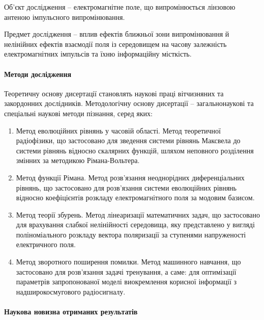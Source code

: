 Об’єкт дослідження -- електромагнітне поле, що випромінюється 
лінзовою антеною імпульсного випромінювання.

Предмет дослідження -- вплив ефектів ближньої зони випромінювання 
й нелінійних ефектів взаємодії поля із середовищем на часову залежність
електромагнітних імпульсів та їхню інформаційну місткість.

\paragraph{Методи дослідження}

Теоретичну основу дисертації становлять наукові праці вітчизняних та 
закордонних дослідників. Методологічну основу дисертації -- 
загальнонаукові та спеціальні наукові методи пізнання, серед яких:

\begin{enumerate}

\item Метод еволюційних рівнянь у часовій області. Метод теоретичної 
радіофізики, що застосовано для зведення системи рівнянь Максвела до 
системи рівнянь відносно скалярних функцій, шляхом неповного розділення 
змінних за методикою Рімана-Вольтера.

\item Метод функції Рімана. Метод розв'язання неоднорідних 
диференціальних рівнянь, що застосовано для розв'язання системи еволюційних рівнянь відносно коефіцієнтів розкладу електромагнітного 
поля за модовим базисом.

\item Метод теорії збурень. Метод лінеаризації математичних задач, що 
застосовано для врахування слабкої нелінійності середовища, яку представлено 
у вигляді поліноміального розкладу вектора поляризації за ступенями 
напруженості електричного поля.

\item Метод зворотного поширення помилки. Метод машинного навчання,
що застосовано для розв'язання задачі тренування, а саме: для 
оптимізації параметрів запропонованої моделі виокремлення корисної 
інформації з надширокосмугового радіосигналу.

\end{enumerate}

\paragraph{Наукова новизна отриманих результатів}

